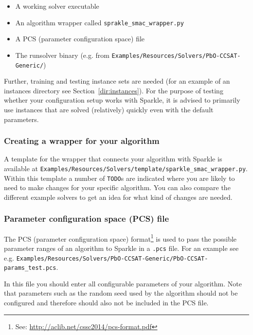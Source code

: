 \documentclass{article}
\begin{document}
\begin{itemize}
  \item A working solver executable
  \item[\ref{quick:config_wrapper}] An algorithm wrapper called \texttt{sprakle\_smac\_wrapper.py}
  \item[\ref{quick:pcs_file}] A PCS (parameter configuration space) file
  \item The runsolver binary (e.g. from \texttt{Examples/Resources/Solvers/PbO-CCSAT-Generic/})
\end{itemize}

Further, training and testing instance sets are needed (for an example of an instances directory see Section~\ref{dir:instances}). For the purpose of testing whether your configuration setup works with Sparkle, it is advised to primarily use instances that are solved (relatively) quickly even with the default parameters.

\subsubsection{Creating a wrapper for your algorithm}
\label{quick:config_wrapper}

A template for the wrapper that connects your algorithm with Sparkle is available at \texttt{Examples/Resources/Solvers/template/sparkle\_smac\_wrapper.py}. Within this template a number of \texttt{TODO}s are indicated where you are likely to need to make changes for your specific algorithm. You can also compare the different example solvers to get an idea for what kind of changes are needed.

\subsubsection{Parameter configuration space (PCS) file}
\label{quick:pcs_file}

The PCS (parameter configuration space) format\footnote{See: \url{http://aclib.net/cssc2014/pcs-format.pdf}} is used to pass the possible parameter ranges of an algorithm to Sparkle in a \texttt{.pcs} file. For an example see e.g. \texttt{Examples/Resources/Solvers/PbO-CCSAT-Generic/PbO-CCSAT-params\_test.pcs}.

In this file you should enter all configurable parameters of your algorithm. Note that parameters such as the random seed used by the algorithm should not be configured and therefore should also not be included in the PCS file.
\end{document}
